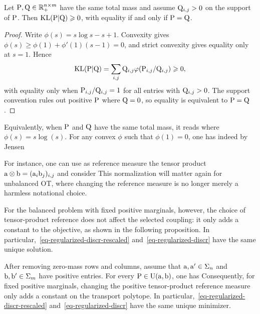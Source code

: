 \begin{prop}\label{prop-kl-distance-like}
	Let $\P,\Q\in\RR_+^{n\times m}$ have the same total mass and assume $\Q_{i,j}>0$ on the support of $\P$. Then $\KLD(\P|\Q)\geq0$, with equality if and only if $\P=\Q$.
\end{prop}
\begin{proof}
	Write $\phi(s)=s\log s-s+1$. Convexity gives $\phi(s)\geq \phi(1)+\phi'(1)(s-1)=0$, and strict convexity gives equality only at $s=1$. Hence
	\[
		\KLD(\P|\Q)=\sum_{i,j}\Q_{i,j}\phi(\P_{i,j}/\Q_{i,j})\geq0,
	\]
	with equality only when $\P_{i,j}/\Q_{i,j}=1$ for all entries with $\Q_{i,j}>0$. The support convention rules out positive $\P$ where $\Q=0$, so equality is equivalent to $\P=\Q$.
\end{proof}

Equivalently, when $\P$ and $\Q$ have the same total mass, it reads
where $\phi(s)=s\log(s)$. For any convex $\phi$ such that $\phi(1)=0$, one has indeed by Jensen

For instance, one can use as reference measure the tensor product $\a \otimes \b = (\a_i \b_j)_{i,j}$ and consider
This normalization will matter again for unbalanced OT, where changing the reference measure is no longer merely a harmless notational choice.

For the balanced problem with fixed positive marginals, however, the choice of tensor-product reference does not affect the selected coupling: it only adds a constant to the objective, as shown in the following proposition. In particular,~\eqref{eq-regularized-discr-rescaled} and~\eqref{eq-regularized-discr} have the same unique solution.

\begin{prop}\label{prop-kl-shift}
	After removing zero-mass rows and columns, assume that $\a,\a'\in\simplex_n$ and $\b,\b'\in\simplex_m$ have positive entries. For every $\P \in \CouplingsD(\a,\b)$, one has
Consequently, for fixed positive marginals, changing the positive tensor-product reference measure only adds a constant on the transport polytope. In particular,~\eqref{eq-regularized-discr-rescaled} and~\eqref{eq-regularized-discr} have the same unique minimizer.
\end{prop}

